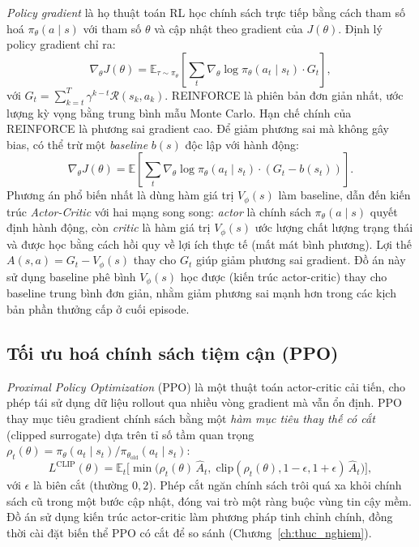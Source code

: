 \documentclass[../DoAn.tex]{subfiles}
\begin{document}
\textit{Policy gradient} là họ thuật toán RL học chính sách trực tiếp bằng cách tham số hoá $\pi_\theta(a \mid s)$ với tham số $\theta$ và cập nhật theo gradient của $J(\theta)$. Định lý policy gradient\cite{sutton2018rl} chỉ ra:
\begin{equation}
    \nabla_\theta J(\theta) = \mathbb{E}_{\tau \sim \pi_\theta}\left[ \sum_t \nabla_\theta \log \pi_\theta(a_t \mid s_t) \cdot G_t \right],
\end{equation}
với $G_t = \sum_{k=t}^{T} \gamma^{k-t} \mathcal{R}(s_k, a_k)$. REINFORCE\cite{williams1992reinforce} là phiên bản đơn giản nhất, ước lượng kỳ vọng bằng trung bình mẫu Monte Carlo. Hạn chế chính của REINFORCE là phương sai gradient cao. Để giảm phương sai mà không gây bias, có thể trừ một \textit{baseline} $b(s)$ độc lập với hành động:
\begin{equation}
    \nabla_\theta J(\theta) = \mathbb{E}\left[ \sum_t \nabla_\theta \log \pi_\theta(a_t \mid s_t) \cdot (G_t - b(s_t)) \right].
\end{equation}
Phương án phổ biến nhất là dùng hàm giá trị $V_\phi(s)$ làm baseline, dẫn đến kiến trúc \textit{Actor-Critic} với hai mạng song song: \textit{actor} là chính sách $\pi_\theta(a\mid s)$ quyết định hành động, còn \textit{critic} là hàm giá trị $V_\phi(s)$ ước lượng chất lượng trạng thái và được học bằng cách hồi quy về lợi ích thực tế (mất mát bình phương). Lợi thế $A(s,a)=G_t - V_\phi(s)$ thay cho $G_t$ giúp giảm phương sai gradient. Đồ án này sử dụng baseline phê bình $V_\phi(s)$ học được (kiến trúc actor-critic) thay cho baseline trung bình đơn giản, nhằm giảm phương sai mạnh hơn trong các kịch bản phần thưởng cấp ở cuối episode.

\subsection{Tối ưu hoá chính sách tiệm cận (PPO)}

\textit{Proximal Policy Optimization} (PPO)\cite{schulman2017ppo} là một thuật toán actor-critic cải tiến, cho phép tái sử dụng dữ liệu rollout qua nhiều vòng gradient mà vẫn ổn định. PPO thay mục tiêu gradient chính sách bằng một \textit{hàm mục tiêu thay thế có cắt} (clipped surrogate) dựa trên tỉ số tầm quan trọng $\rho_t(\theta) = \pi_\theta(a_t\mid s_t)/\pi_{\theta_{\text{old}}}(a_t\mid s_t)$:
\begin{equation}
    L^{\text{CLIP}}(\theta) = \mathbb{E}_t\Big[ \min\big( \rho_t(\theta)\,\hat{A}_t,\; \mathrm{clip}(\rho_t(\theta), 1-\epsilon, 1+\epsilon)\,\hat{A}_t \big) \Big],
    \label{eq:ppo-clip}
\end{equation}
với $\epsilon$ là biên cắt (thường $0{,}2$). Phép cắt ngăn chính sách trôi quá xa khỏi chính sách cũ trong một bước cập nhật, đóng vai trò một ràng buộc vùng tin cậy mềm. Đồ án sử dụng kiến trúc actor-critic làm phương pháp tinh chỉnh chính, đồng thời cài đặt biến thể PPO có cắt để so sánh (Chương~\ref{ch:thuc_nghiem}).
\end{document}
